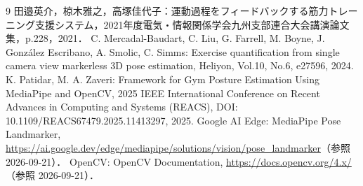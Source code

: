 \documentclass[no-page-number]{nanzan-abstract}
\begin{document}
\begin{thebibliography}{9}
\small
\setlength{\itemsep}{0pt}
 田邉英介，椋木雅之，高塚佳代子：運動過程をフィードバックする筋力トレーニング支援システム，2021年度電気・情報関係学会九州支部連合大会講演論文集，p.228，2021．
 C. Mercadal-Baudart, C. Liu, G. Farrell, M. Boyne, J. González Escribano, A. Smolic, C. Simms: Exercise quantification from single camera view markerless 3D pose estimation, Heliyon, Vol.10, No.6, e27596, 2024.
 K. Patidar, M. A. Zaveri: Framework for Gym Posture Estimation Using MediaPipe and OpenCV, 2025 IEEE International Conference on Recent Advances in Computing and Systems (REACS), DOI: 10.1109/REACS67479.2025.11413297, 2025.
 Google AI Edge: MediaPipe Pose Landmarker, \url{https://ai.google.dev/edge/mediapipe/solutions/vision/pose_landmarker}（参照 2026-09-21）．
 OpenCV: OpenCV Documentation, \url{https://docs.opencv.org/4.x/}（参照 2026-09-21）．
\end{thebibliography}
\end{document}
